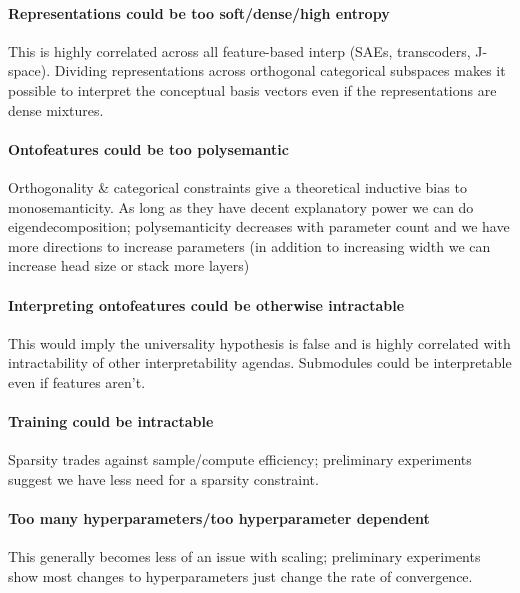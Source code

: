 \paragraph{Representations could be too soft/dense/high entropy}
This is highly correlated across all feature-based interp (SAEs, transcoders, J-space). Dividing representations across orthogonal categorical subspaces makes it possible to interpret the conceptual basis vectors even if the representations are dense mixtures.

\paragraph{Ontofeatures could be too polysemantic}
Orthogonality \& categorical constraints give a theoretical inductive bias to monosemanticity.
As long as they have decent explanatory power we can do eigendecomposition; polysemanticity decreases with parameter count and we have more directions to increase parameters (in addition to increasing width we can increase head size or stack more layers)

\paragraph{Interpreting ontofeatures could be otherwise intractable}
This would imply the universality hypothesis is false and is highly correlated with intractability of other interpretability agendas. Submodules could be interpretable even if features aren't.

\paragraph{Training could be intractable}
Sparsity trades against sample/compute efficiency; preliminary experiments suggest we have less need for a sparsity constraint.

\paragraph{Too many hyperparameters/too hyperparameter dependent}
This generally becomes less of an issue with scaling; preliminary experiments show most changes to hyperparameters just change the rate of convergence.

